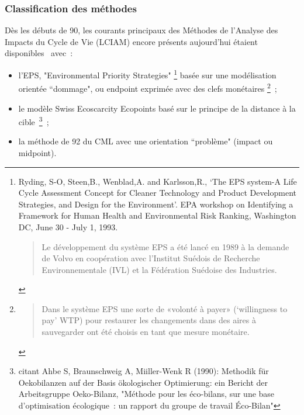 \subsubsection{Classification des méthodes}
  Dès les débuts de 90, les courants principaux des Méthodes de l'Analyse des Impacts du Cycle de Vie (LCIAM) encore présents aujourd'hui étaient disponibles~\cite{margni_life_2012} avec~:
  \begin{itemize}
  \item l'EPS, "Environmental Priority Strategies"
  \footnote{Ryding, S-O, Steen,B., Wenblad,A. and Karlsson,R., ‘The EPS system-A Life Cycle Assessment Concept for Cleaner Technology and Product Development Strategies, and Design for the Environment’. EPA workshop on Identifying a Framework for Human Health and Environmental Risk Ranking, Washington DC, June 30 - July 1, 1993\cite{steen_systematic_1999}.
  \blockcquote{steen_systematic_1999}{
  Le développement du système EPS a été lancé en 1989 à la demande de Volvo en coopération avec l'Institut Suédois de Recherche Environnementale (IVL) et la Fédération Suédoise des Industries.
  }
  }
  basée sur une modélisation orientée ``dommage", ou endpoint exprimée avec des clefs monétaires
  \footnote{
  \blockcquote[traduction, 3.5.1 Environmental philosophy]{steen_systematic_1999}{
  Dans le système EPS une sorte de «volonté à payer» (‘willingness to pay’ WTP) pour restaurer les changements dans des aires à sauvegarder ont été choisis en tant que mesure monétaire.
  }
  }~;
  \item le modèle Swiss Ecoscarcity Ecopoints basé sur le principe de la distance à la cible~\cite{seppala_meaning_2001}\footnote{\citeauthor{seppala_meaning_2001} citant Ahbe S, Braunschweig A, Miiller-Wenk R (1990): Methodik für Oekobilanzen auf der Basis ökologischer Optimierung: ein Bericht der Arbeitsgruppe Oeko-Bilanz, "Méthode pour les éco-bilans, sur une base d'optimisation écologique~: un rapport du groupe de travail Éco-Bilan"}~;
  \item la méthode de 92 du CML avec une orientation ``problème" (impact ou midpoint)\cite{heijungs_environmental_1992}.
  \end{itemize}
   

